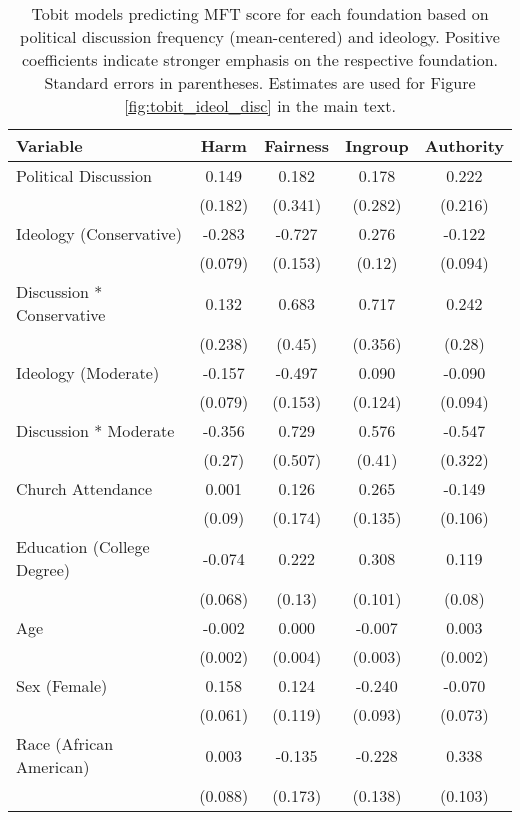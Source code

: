 \begin{table}[ht]
\centering
\caption{Tobit models predicting MFT score for each foundation based 
           on political discussion frequency (mean-centered) and ideology. Positive coefficients 
           indicate stronger emphasis on the respective foundation. Standard errors in parentheses. 
           Estimates are used for Figure \ref{fig:tobit_ideol_disc} in the main text.} 
\label{tab:tobit_ideol_disc}
\begingroup\footnotesize
\begin{tabular}{lcccc}
  \hline
Variable & Harm & Fairness & Ingroup & Authority \\ 
  \hline
Political Discussion &  0.149 &  0.182 &  0.178 &  0.222 \\ 
   & (0.182) & (0.341) & (0.282) & (0.216) \\ 
  Ideology (Conservative) & -0.283 & -0.727 &  0.276 & -0.122 \\ 
   & (0.079) & (0.153) & (0.12) & (0.094) \\ 
  Discussion * Conservative &  0.132 &  0.683 &  0.717 &  0.242 \\ 
   & (0.238) & (0.45) & (0.356) & (0.28) \\ 
  Ideology (Moderate) & -0.157 & -0.497 &  0.090 & -0.090 \\ 
   & (0.079) & (0.153) & (0.124) & (0.094) \\ 
  Discussion * Moderate & -0.356 &  0.729 &  0.576 & -0.547 \\ 
   & (0.27) & (0.507) & (0.41) & (0.322) \\ 
  Church Attendance &  0.001 &  0.126 &  0.265 & -0.149 \\ 
   & (0.09) & (0.174) & (0.135) & (0.106) \\ 
  Education (College Degree) & -0.074 &  0.222 &  0.308 &  0.119 \\ 
   & (0.068) & (0.13) & (0.101) & (0.08) \\ 
  Age & -0.002 &  0.000 & -0.007 &  0.003 \\ 
   & (0.002) & (0.004) & (0.003) & (0.002) \\ 
  Sex (Female) &  0.158 &  0.124 & -0.240 & -0.070 \\ 
   & (0.061) & (0.119) & (0.093) & (0.073) \\ 
  Race (African American) &  0.003 & -0.135 & -0.228 &  0.338 \\ 
   & (0.088) & (0.173) & (0.138) & (0.103) \\ 

\end{tabular}
\end{table}
